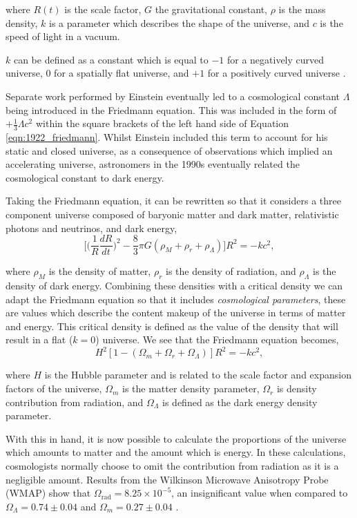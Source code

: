 \documentclass[twocolumn]{revtex4}
\begin{document}
where $R(t)$ is the scale factor, $G$ the gravitational constant, $\rho$ is the mass density, $k$ is a parameter which describes the shape of the universe, and $c$ is the speed of light in a vacuum.

$k$ can be defined as a constant which is equal to $-1$ for a negatively curved universe, $0$ for a spatially flat universe, and $+1$ for a positively curved universe \cite{longair}. 

Separate work performed by Einstein eventually led to a cosmological constant $\Lambda$ being introduced in the Friedmann equation. This was included in the form of $+\tfrac{1}{3}\Lambda c^2$ within the square brackets of the left hand side of Equation \ref{eqn:1922_friedmann}. Whilst Einstein included this term to account for his static and closed universe, as a consequence of observations which implied an accelerating universe, astronomers in the 1990s eventually related the cosmological constant to dark energy.

Taking the Friedmann equation, it can be rewritten so that it considers a three component universe composed of baryonic matter and dark matter, relativistic photons and neutrinos, and dark energy, 
\begin{equation}
\Big[ \Big( \frac{1}{R} \frac{dR}{dt} \Big)^2 - \frac{8}{3} \pi G (\rho_{M} + \rho_{r} + \rho_{\Lambda} )\Big] R^2 = -kc^2,
\end{equation}

where $\rho_{M}$ is the density of matter, $\rho_{r}$ is the density of radiation, and $\rho_{\Lambda}$ is the density of dark energy. Combining these densities with a critical density we can adapt the Friedmann equation so that it includes \textit{cosmological parameters}, these are values which describe the content makeup of the universe in terms of matter and energy. This critical density is defined as the value of the density that will result in a flat ($k=0$) universe. We see that the Friedmann equation becomes,
\begin{equation}
H^2 [1-(\Omega_m + \Omega_{r} + \Omega_{\Lambda})]R^2 = -kc^2,
\label{eqn:friedmann_old}
\end{equation}

where $H$ is the Hubble parameter and is related to the scale factor and expansion factors of the universe, $\Omega_m$ is the matter density parameter, $\Omega_{r}$ is density contribution from radiation, and $\Omega_{\Lambda}$ is defined as the dark energy density parameter.

With this in hand, it is now possible to calculate the proportions of the universe which amounts to matter and the amount which is energy. In these calculations, cosmologists normally choose to omit the contribution from radiation as it is a negligible amount. Results from the Wilkinson Microwave Anisotropy Probe (WMAP) show that $\Omega_{\text{rad}}=8.25 \times 10^{-5}$, an insignificant value when compared to $\Omega_{\Lambda}=0.74 \pm 0.04$ and $\Omega_m = 0.27 \pm 0.04$ \cite{mod_ast}. 
\end{document}

